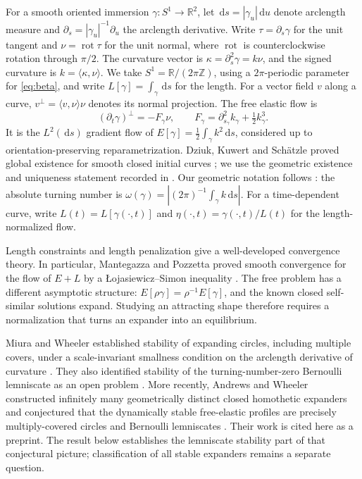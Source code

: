 \documentclass[a4paper,11pt]{article}
\numberwithin{equation}{section}
\theoremstyle{definition}
\theoremstyle{remark}
\newcommand{\R}{\mathbb R}
\newcommand{\Z}{\mathbb Z}
\newcommand{\dd}{\,\mathrm d}
\newcommand{\ip}[2]{\langle#1,#2\rangle}
\begin{document}
For a smooth oriented immersion $\gamma:S^1\to\R^2$, let $\dd s=|\gamma_u|\dd u$ denote arclength measure and $\partial_s=|\gamma_u|^{-1}\partial_u$ the arclength derivative. Write $\tau=\partial_s\gamma$ for the unit tangent and $\nu=\operatorname{rot}\tau$ for the unit normal, where $\operatorname{rot}$ is counterclockwise rotation through $\pi/2$. The curvature vector is $\kappa=\partial_s^2\gamma=k\nu$, and the signed curvature is $k=\ip\kappa\nu$. We take $S^1=\R/(2\pi\Z)$, using a $2\pi$-periodic parameter for \eqref{eq:beta}, and write $L[\gamma]=\int_\gamma\dd s$ for the length. For a vector field $v$ along a curve, $v^\perp=\ip v\nu\nu$ denotes its normal projection. The free elastic flow is
\begin{equation}\label{eq:flow}
 (\partial_t\gamma)^\perp=-F_\gamma\nu,
 \qquad F_\gamma=\partial_{s_\gamma}^2k_\gamma+\tfrac12k_\gamma^3.
\end{equation}
It is the $L^2(\dd s)$ gradient flow of $E[\gamma]=\frac12\int_\gamma k^2\dd s$, considered up to orientation-preserving reparametrization. Dziuk, Kuwert and Sch\"atzle proved global existence for smooth closed initial curves \cite[Theorem~3.2]{DKS}; we use the geometric existence and uniqueness statement recorded in \cite[Theorem~1.1]{MW}. Our geometric notation follows \cite[Section~2.1 and Theorem~1.2]{MW}: the absolute turning number is $\omega(\gamma)=\left|(2\pi)^{-1}\int_\gamma k\dd s\right|$. For a time-dependent curve, write $L(t)=L[\gamma(\cdot,t)]$ and $\eta(\cdot,t)=\gamma(\cdot,t)/L(t)$ for the length-normalized flow.

Length constraints and length penalization give a well-developed convergence theory. In particular, Mantegazza and Pozzetta proved smooth convergence for the flow of $E+L$ by a \L{}ojasiewicz--Simon inequality \cite[Theorem~1.2]{MP}. The free problem has a different asymptotic structure: $E[\rho\gamma]=\rho^{-1}E[\gamma]$, and the known closed self-similar solutions expand. Studying an attracting shape therefore requires a normalization that turns an expander into an equilibrium.

Miura and Wheeler established stability of expanding circles, including multiple covers, under a scale-invariant smallness condition on the arclength derivative of curvature \cite[Theorem~1.2]{MW}. They also identified stability of the turning-number-zero Bernoulli lemniscate as an open problem \cite[Section~1.2]{MW}. More recently, Andrews and Wheeler constructed infinitely many geometrically distinct closed homothetic expanders and conjectured that the dynamically stable free-elastic profiles are precisely multiply-covered circles and Bernoulli lemniscates \cite[Theorem~1.1 and Conjecture~1.4]{Jellyfish}. Their work is cited here as a preprint. The result below establishes the lemniscate stability part of that conjectural picture; classification of all stable expanders remains a separate question.
\end{document}

